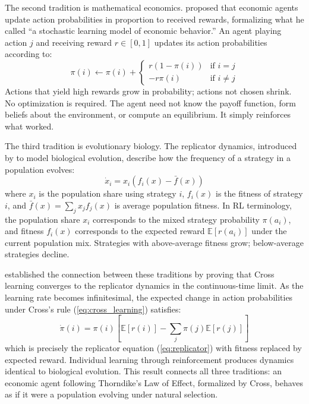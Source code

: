 The second tradition is mathematical economics. \citet{Cross1973} proposed that economic agents update action probabilities in proportion to received rewards, formalizing what he called ``a stochastic learning model of economic behavior.'' An agent playing action $j$ and receiving reward $r \in [0,1]$ updates its action probabilities according to:
\begin{equation}
\pi(i) \leftarrow \pi(i) +
\begin{cases}
r(1 - \pi(i)) & \text{if } i = j \\
-r\pi(i) & \text{if } i \neq j
\end{cases}
\label{eq:cross_learning}
\end{equation}
Actions that yield high rewards grow in probability; actions not chosen shrink. No optimization is required. The agent need not know the payoff function, form beliefs about the environment, or compute an equilibrium. It simply reinforces what worked.

The third tradition is evolutionary biology. The replicator dynamics, introduced by \citet{TaylorJonker1978} to model biological evolution, describe how the frequency of a strategy in a population evolves:
\begin{equation}
\dot{x}_i = x_i(f_i(x) - \bar{f}(x))
\label{eq:replicator}
\end{equation}
where $x_i$ is the population share using strategy $i$, $f_i(x)$ is the fitness of strategy $i$, and $\bar{f}(x) = \sum_j x_j f_j(x)$ is average population fitness. In RL terminology, the population share $x_i$ corresponds to the mixed strategy probability $\pi(a_i)$, and fitness $f_i(x)$ corresponds to the expected reward $\mathbb{E}[r(a_i)]$ under the current population mix. Strategies with above-average fitness grow; below-average strategies decline.

\citet{borgers1997learning} established the connection between these traditions by proving that Cross learning converges to the replicator dynamics in the continuous-time limit. As the learning rate becomes infinitesimal, the expected change in action probabilities under Cross's rule (\ref{eq:cross_learning}) satisfies:
\begin{equation}
\dot{\pi}(i) = \pi(i)\left[\mathbb{E}[r(i)] - \sum_j \pi(j)\mathbb{E}[r(j)]\right]
\end{equation}
which is precisely the replicator equation (\ref{eq:replicator}) with fitness replaced by expected reward. Individual learning through reinforcement produces dynamics identical to biological evolution. This result connects all three traditions: an economic agent following Thorndike's Law of Effect, formalized by Cross, behaves as if it were a population evolving under natural selection.

